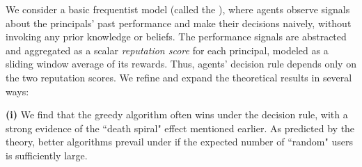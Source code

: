 

We consider a basic frequentist model (called the \emph{\ExptsModel}), where agents observe signals about the principals' past performance and
make their decisions naively,
without invoking any prior knowledge or beliefs. The performance signals are abstracted and aggregated as a scalar \emph{reputation score} for each principal, modeled as a sliding window average of its rewards. Thus, agents' decision rule depends only on the two reputation scores.
We refine and expand the theoretical results in several ways:

\textbf{(i)}
We find that the greedy algorithm often wins under the \HardMax decision rule, with a strong evidence of the ``death spiral" effect mentioned earlier.
 As predicted by the theory, better algorithms prevail under \HardMaxRandom if the expected number of ``random" users is sufficiently large.

